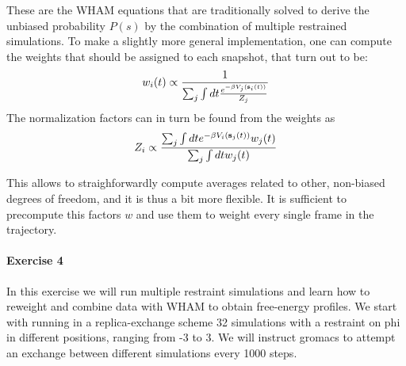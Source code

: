 These are the W\+H\+A\+M equations that are traditionally solved to derive the unbiased probability $P(s)$ by the combination of multiple restrained simulations. To make a slightly more general implementation, one can compute the weights that should be assigned to each snapshot, that turn out to be\+: \[ w_i(t)\propto \frac{1}{\sum_j\int dt\frac{e^{-\beta V_{j}({\bf s}_i(t))}}{Z_{j}} } \] The normalization factors can in turn be found from the weights as \[ Z_i\propto\frac{\sum_j \int dt e^{-\beta V_i({\bf s}_j(t))} w_j(t)}{ \sum_j \int dt w_j(t)} \]

This allows to straighforwardly compute averages related to other, non-\/biased degrees of freedom, and it is thus a bit more flexible. It is sufficient to precompute this factors $w$ and use them to weight every single frame in the trajectory.

\hypertarget{munster_munster-exercise-4}{}\paragraph{Exercise 4}\label{munster_munster-exercise-4}
In this exercise we will run multiple restraint simulations and learn how to reweight and combine data with W\+H\+A\+M to obtain free-\/energy profiles. We start with running in a replica-\/exchange scheme 32 simulations with a restraint on phi in different positions, ranging from -\/3 to 3. We will instruct gromacs to attempt an exchange between different simulations every 1000 steps.



